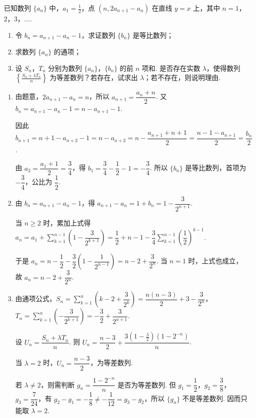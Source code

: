 \begin{problem}
已知数列 \(\{a_{n}\}\) 中，\(a_{1} = \frac{1}{2}\)，点 \((n, 2a_{n+1} - a_{n})\) 在直线 \(y = x\) 上，其中 \(n=1\)，\(2\)，\(3\)，\(\dots\).

\begin{enumerate}
\item 令 \( b_{n} = a_{n+1} - a_{n} - 1 \)，求证数列 \( \{b_{n}\} \) 是等比数列；
\item 求数列 \(\{a_{n}\}\) 的通项；
\item 设 \(S_{n}\)，\(T_{n}\) 分别为数列 \(\{a_{n}\}\)，\(\{b_{n}\}\) 的前 \(n\) 项和. 是否存在实数 \(\lambda\)，使得数列 \(\left\{\frac{S_{n} + \lambda T_{n}}{n}\right\}\) 为等差数列？若存在，试求出 \(\lambda\)；若不存在，则说明理由.
\end{enumerate}
\end{problem}

\begin{solution}
\begin{enumerate}
\item 由题意，\(2a_{n+1}-a_n=n\)，所以 \(a_{n+1}=\dfrac{a_n+n}{2}\). 又 \(b_n=a_{n+1}-a_n-1=n-a_{n+1}-1\).

因此 \(b_{n+1}=n+1-a_{n+2}-1=n-a_{n+2}=n-\dfrac{a_{n+1}+n+1}{2}=\dfrac{n-1-a_{n+1}}{2}=\dfrac{b_n}{2}\).

由 \(a_2=\dfrac{a_1+1}{2}=\dfrac34\)，得 \(b_1=\dfrac34-\dfrac12-1=-\dfrac34\). 所以 \(\{b_n\}\) 是等比数列，首项为 \(-\dfrac34\)，公比为 \(\dfrac12\).
\item 由 \(b_n=a_{n+1}-a_n-1\)，得 \(a_{n+1}-a_n=1+b_n=1-\dfrac{3}{2^{n+1}}\).

当 \(n\geqslant2\) 时，累加上式得 \(a_n=a_1+\sum_{k=1}^{n-1}\left(1-\dfrac{3}{2^{k+1}}\right)=\dfrac12+n-1-\dfrac34\sum_{k=1}^{n-1}\left(\dfrac12\right)^{k-1}\).

于是 \(a_n=n-\dfrac12-\dfrac32\left(1-\dfrac{1}{2^{n-1}}\right)=n-2+\dfrac{3}{2^n}\). 当 \(n=1\) 时，上式也成立，故 \(a_n=n-2+\dfrac{3}{2^n}\).
\item 由通项公式，\(S_n=\sum_{k=1}^n\left(k-2+\dfrac{3}{2^k}\right)=\dfrac{n(n-3)}{2}+3-\dfrac{3}{2^n}\)，\(T_n=\sum_{k=1}^n\left(-\dfrac{3}{2^{k+1}}\right)=-\dfrac32+\dfrac{3}{2^{n+1}}\).

设 \(U_n=\dfrac{S_n+\lambda T_n}{n}\). 则 \(U_n=\dfrac{n-3}{2}+\dfrac{3\left(1-\frac{\lambda}{2}\right)\left(1-2^{-n}\right)}{n}\).

当 \(\lambda=2\) 时，\(U_n=\dfrac{n-3}{2}\)，为等差数列.

若 \(\lambda\neq2\)，则需判断 \(g_n=\dfrac{1-2^{-n}}{n}\) 是否为等差数列. 但 \(g_1=\dfrac12\)，\(g_2=\dfrac38\)，\(g_3=\dfrac{7}{24}\)，有 \(g_2-g_1=-\dfrac18\neq-\dfrac1{12}=g_3-g_2\)，所以 \(\{g_n\}\) 不是等差数列. 因而只能取 \(\lambda=2\).
\end{enumerate}
\end{solution}
